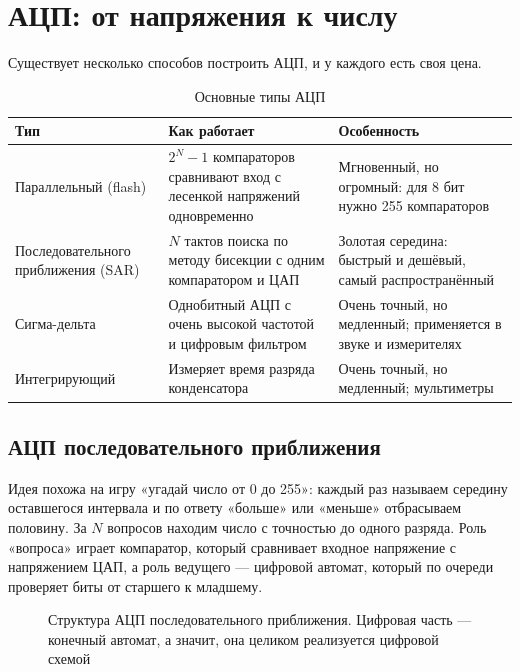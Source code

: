 \section{АЦП: от напряжения к числу}

Существует несколько способов построить АЦП, и у каждого есть своя цена.

\begin{table}[H]
\centering
\caption{Основные типы АЦП}
\small
\begin{tabularx}{\textwidth}{l X X}
\toprule
\textbf{Тип} & \textbf{Как работает} & \textbf{Особенность} \\
\midrule
Параллельный (flash) & $2^N-1$ компараторов сравнивают вход с лесенкой напряжений одновременно & Мгновенный, но огромный: для 8 бит нужно 255 компараторов \\
Последовательного приближения (SAR) & $N$ тактов поиска по методу бисекции с одним компаратором и ЦАП & Золотая середина: быстрый и дешёвый, самый распространённый \\
Сигма-дельта & Однобитный АЦП с очень высокой частотой и цифровым фильтром & Очень точный, но медленный; применяется в звуке и измерителях \\
Интегрирующий & Измеряет время разряда конденсатора & Очень точный, но медленный; мультиметры \\
\bottomrule
\end{tabularx}
\end{table}

\subsection{АЦП последовательного приближения}

Идея похожа на игру «угадай число от 0 до 255»: каждый раз называем середину
оставшегося интервала и по ответу «больше» или «меньше» отбрасываем половину.
За $N$ вопросов находим число с точностью до одного разряда. Роль
«вопроса» играет компаратор, который сравнивает входное напряжение с
напряжением ЦАП, а роль ведущего --- цифровой автомат, который по очереди
проверяет биты от старшего к младшему.

\begin{figure}[H]
\centering
{}
\caption{Структура АЦП последовательного приближения. Цифровая часть --- конечный автомат, а значит, она целиком реализуется цифровой схемой}
\end{figure}

